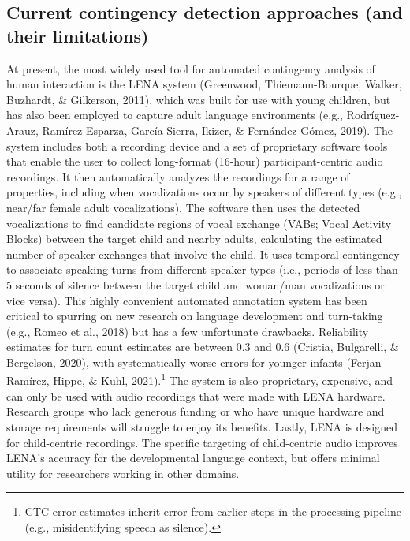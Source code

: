 \documentclass[10pt, letterpaper]{article}
\begin{document}
\hypertarget{current-contingency-detection-approaches-and-their-limitations}{%
\subsection{Current contingency detection approaches (and their
limitations)}\label{current-contingency-detection-approaches-and-their-limitations}}

At present, the most widely used tool for automated contingency analysis
of human interaction is the LENA system (Greenwood, Thiemann-Bourque,
Walker, Buzhardt, \& Gilkerson, 2011), which was built for use with
young children, but has also been employed to capture adult language
environments (e.g., Rodríguez-Arauz, Ramírez-Esparza, García-Sierra,
Ikizer, \& Fernández-Gómez, 2019). The system includes both a recording
device and a set of proprietary software tools that enable the user to
collect long-format (16-hour) participant-centric audio recordings. It
then automatically analyzes the recordings for a range of properties,
including when vocalizations occur by speakers of different types (e.g.,
near/far female adult vocalizations). The software then uses the
detected vocalizations to find candidate regions of vocal exchange
(VABs; Vocal Activity Blocks) between the target child and nearby
adults, calculating the estimated number of speaker exchanges that
involve the child. It uses temporal contingency to associate speaking
turns from different speaker types (i.e., periods of less than 5 seconds
of silence between the target child and woman/man vocalizations or vice
versa). This highly convenient automated annotation system has been
critical to spurring on new research on language development and
turn-taking (e.g., Romeo et al., 2018) but has a few unfortunate
drawbacks. Reliability estimates for turn count estimates are between
0.3 and 0.6 (Cristia, Bulgarelli, \& Bergelson, 2020), with
systematically worse errors for younger infants (Ferjan-Ramírez, Hippe,
\& Kuhl, 2021).\footnote{CTC error estimates inherit error from earlier
  steps in the processing pipeline (e.g., misidentifying speech as
  silence).} The system is also proprietary, expensive, and can only be
used with audio recordings that were made with LENA hardware. Research
groups who lack generous funding or who have unique hardware and storage
requirements will struggle to enjoy its benefits. Lastly, LENA is
designed for child-centric recordings. The specific targeting of
child-centric audio improves LENA's accuracy for the developmental
language context, but offers minimal utility for researchers working in
other domains.
\end{document}

